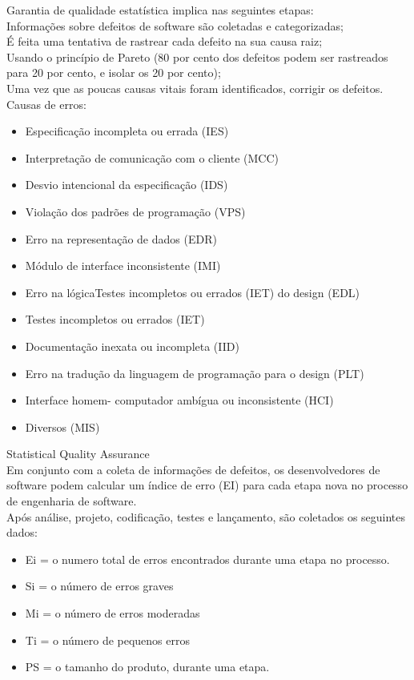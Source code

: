 \documentclass[12pt]{article}
\begin{document}
        Garantia de qualidade estatística implica nas seguintes etapas: \\
        Informações sobre defeitos de software são coletadas e categorizadas;\\
        É feita uma tentativa de rastrear cada defeito na sua causa raiz;\\
        Usando o princípio de Pareto (80 por cento dos defeitos podem ser rastreados para 20 por cento, e isolar os 20 por cento);\\
        Uma vez que as poucas causas vitais foram identificados, corrigir os defeitos.\\
        Causas de erros: 
        \begin{itemize}
            \item Especificação incompleta ou errada (IES) 
            \item Interpretação de comunicação com o cliente (MCC) 
            \item Desvio intencional da especificação (IDS) 
            \item 	Violação dos padrões de programação (VPS) 
            \item Erro na representação de dados (EDR) 
            \item Módulo de interface inconsistente (IMI)
            \item Erro na lógicaTestes incompletos ou errados (IET)  do design (EDL) 
            \item Testes incompletos ou errados (IET) 
            \item 	Documentação inexata ou incompleta (IID) 
            \item Erro na tradução da linguagem de programação para o design (PLT) 
            \item Interface homem- computador ambígua ou inconsistente (HCI)
            \item Diversos (MIS) 
        \end{itemize}
        Statistical Quality Assurance \\
        Em conjunto com a coleta de informações de defeitos, os desenvolvedores de software podem calcular um índice de erro (EI) para cada etapa nova no processo de engenharia de software. \\
        Após análise, projeto, codificação, testes e lançamento, são coletados os seguintes dados: \\
        \begin{itemize}
            \item Ei = o numero total de erros encontrados durante uma etapa no processo. 
            \item Si = o número de erros graves 
            \item Mi = o número de erros moderadas 
            \item Ti = o número de pequenos erros 
            \item PS = o tamanho do produto, durante uma etapa. 
        \end{itemize}
\end{document}
